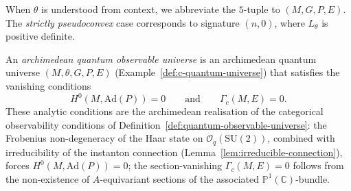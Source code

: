\begin{remark}
\label{rem:notation-special-cases}
When $\theta$ is understood from context, we abbreviate the $5$-tuple to
$(M, G, P, E)$.  The \emph{strictly pseudoconvex} case corresponds to
signature $(n,0)$, where $L_\theta$ is positive definite.
\end{remark}

\begin{example}
\label{def:c-quantum-observable-universe}
\leanok
An \emph{archimedean quantum observable universe} is an archimedean quantum
universe $(M, \theta, G, P, E)$
(Example~\ref{def:c-quantum-universe}) that satisfies
the vanishing conditions
\[
  H^0(M, \mathrm{Ad}(P)) = 0
  \qquad\text{and}\qquad
  \Gamma_c(M, E) = 0.
\]
These analytic conditions are the archimedean realisation of the
categorical observability conditions of
Definition~\ref{def:quantum-observable-universe}: the Frobenius
non-degeneracy of the Haar state on $\mathcal{O}_q(\mathrm{SU}(2))$,
combined with irreducibility of the instanton connection
(Lemma~\ref{lem:irreducible-connection}), forces
$H^0(M, \mathrm{Ad}(P)) = 0$; the section-vanishing
$\Gamma_c(M, E) = 0$ follows from the non-existence of
$A$-equivariant sections of the associated $\mathbb{P}^1(\mathbb{C})$-bundle.
\end{example}

